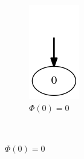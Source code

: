 \begin{example}
	\begin{figure}[h!]
		\centering
		\begin{subfigure}[b]{0.2\textwidth}
			\includegraphics[width=\textwidth]{images/on-the-fly-example-eve/step2.png}
			\caption{$\Phi(0)=0$}
		\end{subfigure}
		\hfill
		~ %

\end{figure}
\end{example}
